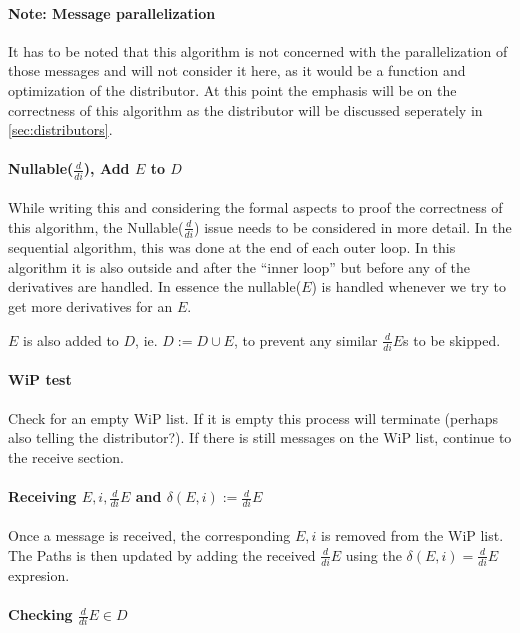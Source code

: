 \documentclass[a4paper,11pt]{report}
\begin{document}
\paragraph{Note: Message parallelization}

It has to be noted that this algorithm is not concerned with the
parallelization of those messages and will not consider it here, as it
would be a function and optimization of the distributor. At this point
the emphasis will be on the correctness of this algorithm as the
distributor will be discussed seperately in \ref{sec:distributors}.

\paragraph{Nullable($\frac{d}{di}$), Add $E$ to $D$}
\label{sec:nullablefracddi}
While writing this and considering the formal aspects to proof the
correctness of this algorithm, the Nullable($\frac{d}{di}$) issue
needs to be considered in more detail. In the sequential algorithm,
this was done at the end of each outer loop. In this algorithm it is
also outside and after the ``inner loop'' but before any of the
derivatives are handled. In essence the nullable($E$) is handled
whenever we try to get more derivatives for an $E$.

$E$ is also added to $D$, ie. $D:=D\cup {E}$, to prevent any similar
$\frac{d}{di}E$s to be skipped.

\paragraph{WiP test}
\label{sec:wip-test}

Check for an empty WiP list. If it is empty this process will
terminate (perhaps also telling the distributor?).  If there is still
messages on the WiP list, continue to the receive section.

\paragraph{Receiving ${E,i,\frac{d}{di}E}$ and $\delta(E,i):=\frac{d}{di}E$}
\label{sec:receiving-e-i}

Once a message is received, the corresponding ${E,i}$ is removed from
the WiP list. The Paths is then updated by adding the received
$\frac{d}{di}E$ using the $\delta(E,i)=\frac{d}{di}E$ expresion.

\paragraph{Checking $\frac{d}{di}E \in D$}
\end{document}
